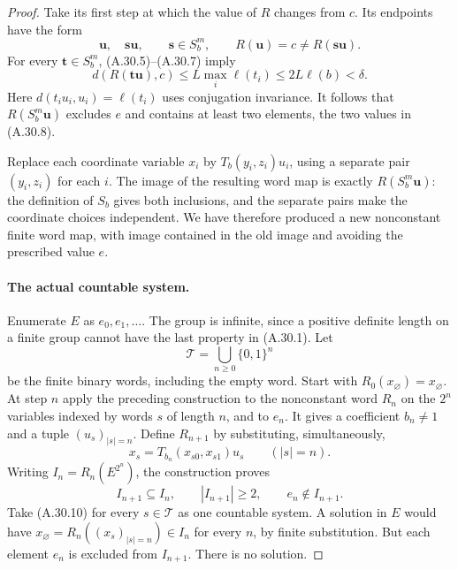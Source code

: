\begin{proof}
Take its first step at which the value of $R$ changes from
$c$. Its endpoints have the form
\[
 \mathbf u,\quad\mathbf s\mathbf u,
 \qquad \mathbf s\in S_b^m,
 \qquad R(\mathbf u)=c\ne R(\mathbf s\mathbf u).
 \tag{A.30.8}
\]
For every $\mathbf t\in S_b^m$, (A.30.5)--(A.30.7) imply
\[
 d(R(\mathbf t\mathbf u),c)
 \leq L\max_i\ell(t_i)
 \leq 2L\ell(b)<\delta.
 \tag{A.30.9}
\]
Here $d(t_i u_i,u_i)=\ell(t_i)$ uses conjugation invariance.
It follows that $R(S_b^m\mathbf u)$ excludes $e$ and contains
at least two elements, the two values in (A.30.8).

Replace each coordinate variable $x_i$ by
$T_b(y_i,z_i)u_i$, using a separate pair $(y_i,z_i)$ for
each $i$. The image of the resulting word map is exactly
$R(S_b^m\mathbf u)$: the definition of $S_b$ gives both
inclusions, and the separate pairs make the coordinate
choices independent. We have therefore produced a new
nonconstant finite word map, with image contained in the
old image and avoiding the prescribed value $e$.

\paragraph{The actual countable system.}
Enumerate $E$ as $e_0,e_1,\ldots$. The group is infinite,
since a positive definite length on a finite group cannot
have the last property in (A.30.1). Let
\[
 \mathcal T=\bigcup_{n\geq0}\{0,1\}^n
\]
be the finite binary words, including the empty word.
Start with $R_0(x_{\varnothing})=x_{\varnothing}$.
At step $n$ apply the preceding construction to the
nonconstant word $R_n$ on the $2^n$ variables indexed by
words $s$ of length $n$, and to $e_n$. It gives a coefficient
$b_n\ne1$ and a tuple $(u_s)_{|s|=n}$.
Define $R_{n+1}$ by substituting, simultaneously,
\[
 x_s=T_{b_n}(x_{s0},x_{s1})u_s
 \qquad(|s|=n).
 \tag{A.30.10}
\]
Writing $I_n=R_n(E^{2^n})$, the construction proves
\[
 I_{n+1}\subseteq I_n,\qquad |I_{n+1}|\geq2,
 \qquad e_n\notin I_{n+1}.
 \tag{A.30.11}
\]
Take (A.30.10) for every $s\in\mathcal T$ as one
countable system. A solution in $E$ would have
$x_{\varnothing}=R_n((x_s)_{|s|=n})\in I_n$ for every
$n$, by finite substitution. But each element $e_n$ is
excluded from $I_{n+1}$. There is no solution.


\end{proof}
